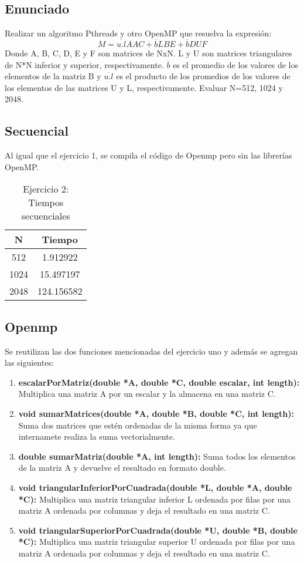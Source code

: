\subsection{Enunciado}
Realizar un algoritmo Pthreads y otro OpenMP que resuelva la expresión:
$$ M = \overline{u.l}AAC + \overline{b}LBE + \overline{b}DUF $$
Donde A, B, C, D, E y F son matrices de NxN. L y U son matrices
triangulares de N*N inferior y superior, respectivamente. $\overline{b}$ es el promedio de los valores de los elementos de la matriz B y $\overline{u.l}$ es el producto de los promedios de los valores de los elementos de las matrices U y L, respectivamente. Evaluar N=512, 1024 y 2048.

\subsection{Secuencial}

Al igual que el ejercicio 1, se compila el código de Openmp pero sin las librerías OpenMP.

\begin{table}[htbp]
\centering
\caption{Ejercicio 2: Tiempos secuenciales}
\label{my-label}
\begin{tabular}{|c|c|}
\hline
\textbf{N} & \textbf{Tiempo} \\ \hline
512        & 1.912922        \\ \hline
1024       & 15.497197       \\ \hline
2048       & 124.156582      \\ \hline
\end{tabular}
\end{table}

\subsection{Openmp}

Se reutilizan las dos funciones mencionadas del ejercicio uno y además se agregan las siguientes:

\begin{enumerate}
\item \textbf{escalarPorMatriz(double *A, double *C, double escalar, int length):} Multiplica una matriz A por un escalar y la almacena en una matriz C.
\item \textbf{void sumarMatrices(double *A, double *B, double *C, int length):} Suma dos matrices que estén ordenadas de la misma forma ya que internamete realiza la suma vectorialmente.
\item \textbf{double sumarMatriz(double *A, int length):} Suma todos los elementos de la matriz A y devuelve el resultado en formato double.
\item \textbf{void triangularInferiorPorCuadrada(double *L, double *A, double *C):} Multiplica una matriz triangular inferior L ordenada por filas por una matriz A ordenada por columnas y deja el resultado en una matriz C.
\item \textbf{void triangularSuperiorPorCuadrada(double *U, double *B, double *C):} Multiplica una matriz triangular superior U ordenada por filas por una matriz A ordenada por columnas y deja el resultado en una matriz C.
\end{enumerate}

